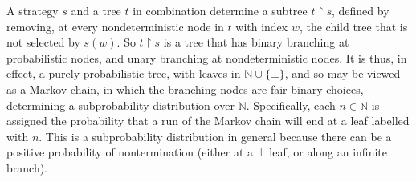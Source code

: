 A strategy $s$ and a tree $t$ in combination determine a subtree $t\restriction s$, defined by 
removing, at every nondeterministic node in $t$ with index $w$, the child tree that is not selected by $s(w)$. So $t\restriction s$ is a tree that has binary branching at probabilistic nodes, and unary branching at nondeterministic nodes. It is thus, in effect, a purely probabilistic tree, with leaves in $\mathbb{N}\cup\{\bot\}$, and so may be viewed as a Markov chain, in which the branching nodes are fair binary choices, determining  a subprobability distribution over $\mathbb{N}$. Specifically, each $n \in \mathbb{N}$ is assigned the probability that a run of the Markov chain will end at a leaf labelled with $n$. This is a subprobability distribution in general because there can  be a positive probability of nontermination (either at a $\bot$ leaf, or along an infinite branch).


